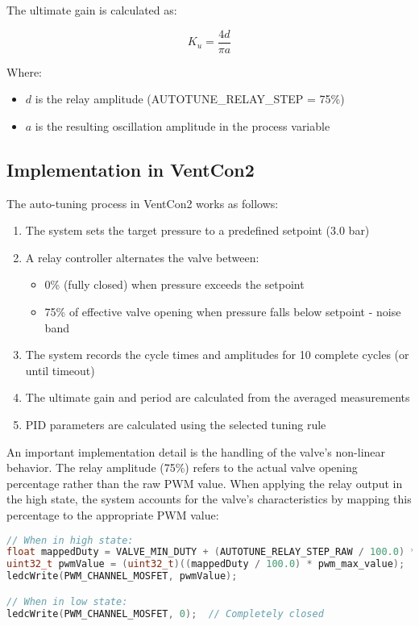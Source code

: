 \documentclass[a4paper,11pt]{article}
\begin{document}
The ultimate gain is calculated as:

\begin{equation}
K_u = \frac{4d}{\pi a}
\end{equation}

Where:
\begin{itemize}
    \item $d$ is the relay amplitude (AUTOTUNE\_RELAY\_STEP = 75\%)
    \item $a$ is the resulting oscillation amplitude in the process variable
\end{itemize}

\subsection{Implementation in VentCon2}

The auto-tuning process in VentCon2 works as follows:

\begin{enumerate}
    \item The system sets the target pressure to a predefined setpoint (3.0 bar)
    \item A relay controller alternates the valve between:
    \begin{itemize}
        \item 0\% (fully closed) when pressure exceeds the setpoint
        \item 75\% of effective valve opening when pressure falls below setpoint - noise band
    \end{itemize}
    \item The system records the cycle times and amplitudes for 10 complete cycles (or until timeout)
    \item The ultimate gain and period are calculated from the averaged measurements
    \item PID parameters are calculated using the selected tuning rule
\end{enumerate}

An important implementation detail is the handling of the valve's non-linear behavior. The relay amplitude (75\%) refers to the actual valve opening percentage rather than the raw PWM value. When applying the relay output in the high state, the system accounts for the valve's characteristics by mapping this percentage to the appropriate PWM value:

\begin{lstlisting}[language=C++, caption=Auto-Tuning Relay Output]
// When in high state:
float mappedDuty = VALVE_MIN_DUTY + (AUTOTUNE_RELAY_STEP_RAW / 100.0) * (VALVE_MAX_DUTY - VALVE_MIN_DUTY);
uint32_t pwmValue = (uint32_t)((mappedDuty / 100.0) * pwm_max_value);
ledcWrite(PWM_CHANNEL_MOSFET, pwmValue);

// When in low state:
ledcWrite(PWM_CHANNEL_MOSFET, 0);  // Completely closed
\end{lstlisting}
\end{document}
